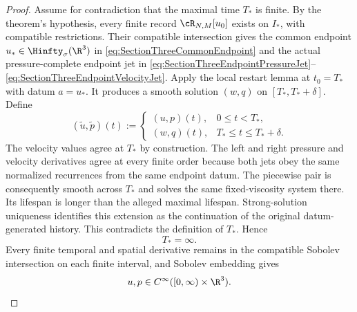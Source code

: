 \begin{proof}
Assume for contradiction that the maximal time \(T_*\) is finite.
By the theorem's hypothesis, every finite record \(\cR_{N,M}[u_0]\) exists on \(I_*\), with compatible restrictions.
Their compatible intersection gives the common endpoint \(u_*\in\Hinfty_\sigma(\R^3)\) in \eqref{eq:SectionThreeCommonEndpoint} and the actual pressure-complete endpoint jet in \eqref{eq:SectionThreeEndpointPressureJet}--\eqref{eq:SectionThreeEndpointVelocityJet}.
Apply the local restart lemma at \(t_0=T_*\) with datum \(a=u_*\).
It produces a smooth solution \((w,q)\) on \([T_*,T_*+\delta]\).
Define
\[
  (\widetilde u,\widetilde p)(t)
  :=
  \begin{cases}
    (u,p)(t),&0\leq t<T_*,\\
    (w,q)(t),&T_*\leq t\leq T_*+\delta.
  \end{cases}
\]
The velocity values agree at \(T_*\) by construction.
The left and right pressure and velocity derivatives agree at every finite order because both jets obey the same normalized recurrences from the same endpoint datum.
The piecewise pair is consequently smooth across \(T_*\) and solves the same fixed-viscosity system there.
Its lifespan is longer than the alleged maximal lifespan.
Strong-solution uniqueness identifies this extension as the continuation of the original datum-generated history.
This contradicts the definition of \(T_*\).
Hence
\[
  T_*=\infty.
\]
Every finite temporal and spatial derivative remains in the compatible Sobolev intersection on each finite interval, and Sobolev embedding gives
\[
  u,p\in C^\infty([0,\infty)\times\R^3).
\]
\end{proof}
